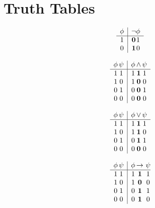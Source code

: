 \chapter{Truth Tables}

\[ \begin{array}{c | c@{}c}
     \phi & \neg & \phi \\ \hline
         1 & \mathbf{0} & 1 \\
      0 & \mathbf{1} & 0 \end{array} \]

  \[ \begin{array}{ c@{\, }c | c@{\, }c@{\, }c}
\phi & \psi  &  \phi & \wedge & \psi   \\
\hline 
1 & 1 &  1 & \mathbf{1} & 1  \\
1 & 0 &  1 & \mathbf{0} & 0  \\
0 & 1 &  0 & \mathbf{0} & 1  \\
0 & 0 &  0 & \mathbf{0} & 0  \\
     \end{array} \]

\[ \begin{array}{ c@{\, }c | c@{\, }c@{\, }c}
\phi & \psi  &  \phi & \vee & \psi   \\
\hline 
1 & 1 &  1 & \mathbf{1} & 1  \\
1 & 0 &  1 & \mathbf{1} & 0  \\
0 & 1 &  0 & \mathbf{1} & 1  \\
0 & 0 &  0 & \mathbf{0} & 0  \\
   \end{array} \]

\[ \begin{array}{ c@{\, }c | c@{\, }c@{\, }@{\, }c@{ }@{ }c@{ }@{ }c}
\phi  & \psi &  \phi & \to  & \psi & \\
\hline 
1 & 1  & 1 & \mathbf{1} & 1 & \\
1 & 0  & 1 & \mathbf{0} & 0 & \\
0 & 1  & 0 & \mathbf{1} & 1 & \\
0 & 0  & 0 & \mathbf{1} & 0 & \\
   \end{array} \]


